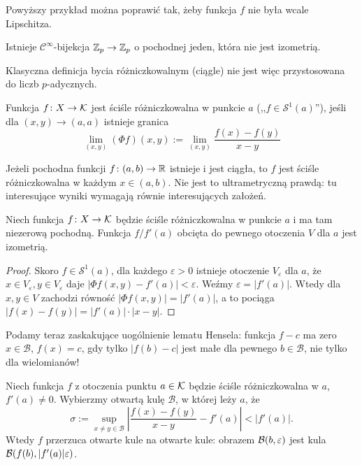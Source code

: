 Powyższy przykład można poprawić tak, żeby funkcja $f$ nie była wcale Lipschitza.

\begin{przyklad}
	Istnieje $\mathcal C^\infty$-bijekcja $\mathbb Z_p \to \mathbb Z_p$ o pochodnej jeden, która nie jest izometrią.
\end{przyklad}


Klasyczna definicja bycia różniczkowalnym (ciągle) nie jest  więc przystosowana do liczb $p$-adycznych.

\begin{definicja}
	Funkcja $f \colon X \to \mathcal K $ jest ściśle różniczkowalna w punkcie $a$ (,,$f \in \mathcal S^1(a)$''), jeśli dla $(x,y) \to (a,a)$ istnieje granica
	\[
		\lim_{(x,y)} (\Phi f)(x,y) := \lim_{(x,y)} \frac{f(x)-f(y)}{x-y}
	\]
\end{definicja}

Jeżeli pochodna funkcji $f \colon (a,b) \to \mathbb R$ istnieje i jest ciągła, to $f$ jest ściśle różniczkowalna w każdym $x \in (a,b)$.
Nie jest to ultrametryczną prawdą: tu interesujące wyniki wymagają równie interesujących założeń.

\begin{fakt}
	Niech funkcja $f \colon X \to \mathcal K$ będzie ściśle różniczkowalna w punkcie $a$ i ma tam niezerową pochodną.
	Funkcja $f / f'(a)$ obcięta do pewnego otoczenia $V$ dla $a$ jest izometrią.
\end{fakt}

\begin{proof}
	Skoro $f \in \mathcal S^1 (a)$, dla każdego $\varepsilon > 0$ istnieje otoczenie $V_\varepsilon$ dla $a$, że
	$
		x \in V_\varepsilon, y \in V_\varepsilon$ daje $|\Phi f(x,y) - f'(a)| < \varepsilon.
	$
	Weźmy $\varepsilon = |f'(a)|$.
	Wtedy dla $x, y \in V$ zachodzi równość $|\Phi f(x,y)| = |f'(a)|$, a to pociąga $|f(x) - f(y)| = |f'(a)| \cdot |x-y|$.
\end{proof}

Podamy teraz zaskakujące uogólnienie lematu Hensela: funkcja $f-c$ ma zero $x \in \mathcal B$, $f(x) = c$, gdy tylko $|f(b)-c|$ jest małe dla pewnego $b \in \mathcal B$, nie tylko dla wielomianów!

\begin{fakt}
	Niech funkcja $f$ z otoczenia punktu $a \in \mathcal K$ będzie ściśle różniczkowalna w $a$, $f'(a) \neq 0$.
	Wybierzmy otwartą kulę $\mathcal B$, w której leży $a$, że
	\[
		\sigma := \sup_{x\neq y \in \mathcal B} \left|\frac{f(x)-f(y)}{x-y} - f'(a)\right| < |f'(a)|.
	\]
	Wtedy $f$ przerzuca otwarte kule na otwarte kule: obrazem $\mathcal B(b, \varepsilon)$ jest kula $\mathcal B(f(b), |f'(a)| \varepsilon)$.
\end{fakt}


